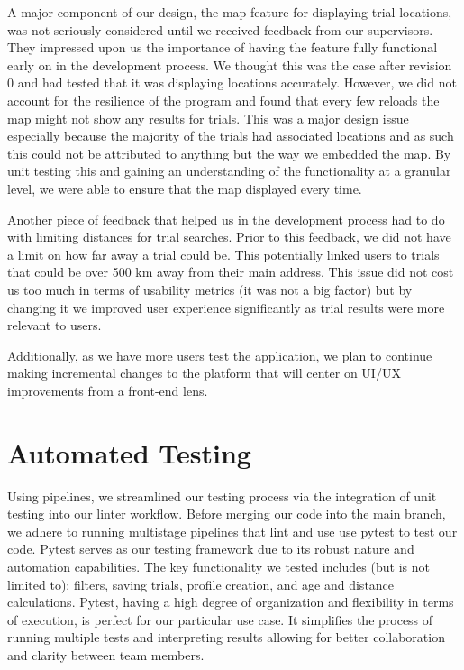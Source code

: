 \documentclass[12pt, titlepage]{article}
\begin{document}
A major component of our design, the map feature for displaying trial locations, 
was not seriously considered until we received feedback from our supervisors. They impressed upon
us the importance of having the feature fully functional early on in the development process.
We thought this was the case after revision 0 and had tested that it was displaying locations
accurately. However, we did not account for the resilience of the program and found that every few reloads
the map might not show any results for trials. This was a major design issue
especially because the majority of the trials had associated locations and as such this could not be
attributed to anything but the way we embedded the map.  
By unit testing this and gaining an understanding of the functionality at a granular level, 
we were able to ensure that the map displayed every time. \newline 

Another piece of feedback that helped us in the development process
had to do with limiting distances for trial searches. Prior to this feedback, 
we did not have a limit on how far away a trial could be. This potentially linked 
users to trials that could be over 500 km away from their main address. This issue did not 
cost us too much in terms of usability metrics (it was not a big factor) but by changing it
we improved user experience significantly as trial results were more relevant to users. \newline

Additionally, as we have more users test the application, we plan to continue making incremental changes 
to the platform that will center on UI/UX improvements from a front-end lens. 


\section{Automated Testing}
Using pipelines, we streamlined our testing process via the integration of unit 
testing into our linter workflow. Before merging our code into the main branch, we adhere
to running multistage pipelines that lint and use use pytest to test our code.
Pytest serves as our testing framework
due to its robust nature and automation capabilities. The key functionality we tested includes (but is not limited to):
filters, saving trials, profile creation, and age and distance calculations. Pytest, having a high degree of organization and flexibility 
in terms of execution, is perfect
for our particular use case. It simplifies the process of running multiple tests and interpreting results
allowing for better collaboration and clarity between team members. 
\end{document}
